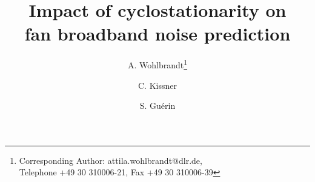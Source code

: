 \documentclass[preprint,3p,11pt,times]{elsarticle}
\begin{document}

\setcounter{page}{1}
 \listoftodos
% 

\clearpage
\begin{frontmatter}
\setcounter{page}{1}



\title{Impact of cyclostationarity on \\fan broadband noise prediction}

\author{A. Wohlbrandt\footnote{Corresponding Author: attila.wohlbrandt@dlr.de,\\ Telephone +49 30 310006-21, Fax +49 30 310006-39 }}
\author{C. Kissner}
\author{S. Gu\'erin}
\address{Institute of Propulsion Technology, Engine Acoustics Department\\ German Aerospace Center (DLR), M\"uller-Breslau-Str.8, 10623 Berlin, Germany}



\end{frontmatter}
\end{document}
